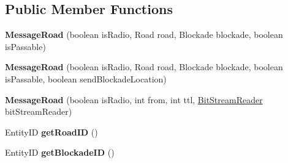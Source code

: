 \subsection*{Public Member Functions}
\begin{DoxyCompactItemize}
\item 
\hypertarget{classadf_1_1agent_1_1communication_1_1standard_1_1bundle_1_1information_1_1MessageRoad_a3f87c5cb8a5bcec1466c985eee8a915b}{}\label{classadf_1_1agent_1_1communication_1_1standard_1_1bundle_1_1information_1_1MessageRoad_a3f87c5cb8a5bcec1466c985eee8a915b} 
{\bfseries Message\+Road} (boolean is\+Radio, Road road, Blockade blockade, boolean is\+Passable)
\item 
\hypertarget{classadf_1_1agent_1_1communication_1_1standard_1_1bundle_1_1information_1_1MessageRoad_aa695589432046b9ccd61258fcb059b7a}{}\label{classadf_1_1agent_1_1communication_1_1standard_1_1bundle_1_1information_1_1MessageRoad_aa695589432046b9ccd61258fcb059b7a} 
{\bfseries Message\+Road} (boolean is\+Radio, Road road, Blockade blockade, boolean is\+Passable, boolean send\+Blockade\+Location)
\item 
\hypertarget{classadf_1_1agent_1_1communication_1_1standard_1_1bundle_1_1information_1_1MessageRoad_a0ebfa1d85c2e3dd67d751783e0b99308}{}\label{classadf_1_1agent_1_1communication_1_1standard_1_1bundle_1_1information_1_1MessageRoad_a0ebfa1d85c2e3dd67d751783e0b99308} 
{\bfseries Message\+Road} (boolean is\+Radio, int from, int ttl, \hyperlink{classadf_1_1component_1_1communication_1_1util_1_1BitStreamReader}{Bit\+Stream\+Reader} bit\+Stream\+Reader)
\item 
\hypertarget{classadf_1_1agent_1_1communication_1_1standard_1_1bundle_1_1information_1_1MessageRoad_a9dfb5acf5e94af347fe8036601f87b3a}{}\label{classadf_1_1agent_1_1communication_1_1standard_1_1bundle_1_1information_1_1MessageRoad_a9dfb5acf5e94af347fe8036601f87b3a} 
Entity\+ID {\bfseries get\+Road\+ID} ()
\item 
\hypertarget{classadf_1_1agent_1_1communication_1_1standard_1_1bundle_1_1information_1_1MessageRoad_a0debc0a4c350bfb4ccb7edd6cdbd98e6}{}\label{classadf_1_1agent_1_1communication_1_1standard_1_1bundle_1_1information_1_1MessageRoad_a0debc0a4c350bfb4ccb7edd6cdbd98e6} 
Entity\+ID {\bfseries get\+Blockade\+ID} ()
\item 
\hypertarget{classadf_1_1agent_1_1communication_1_1standard_1_1bundle_1_1information_1_1MessageRoad_a555dd76ef98b3b55079e7df1b01d2c1e}{}\label{classadf_1_1agent_1_1communication_1_1standard_1_1bundle_1_1information_1_1MessageRoad_a555dd76ef98b3b55079e7df1b01d2c1e} 

\end{DoxyCompactItemize}
